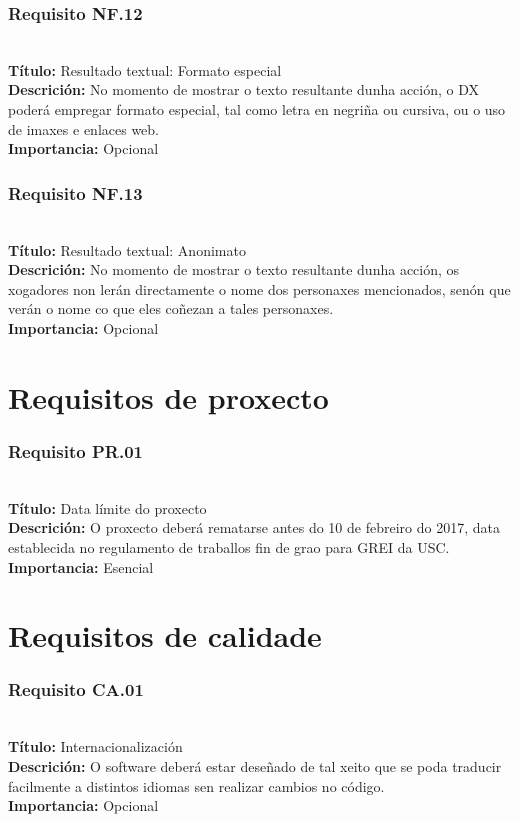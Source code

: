 \subsubsection{Requisito NF.12}~\\
{\bf Título:} Resultado textual: Formato especial\\
{\bf Descrición:} No momento de mostrar o texto resultante dunha acción, o DX
poderá empregar formato especial, tal como letra en negriña ou cursiva, ou o
uso de imaxes e enlaces web.\\
{\bf Importancia:} Opcional

\subsubsection{Requisito NF.13}~\\
{\bf Título:} Resultado textual: Anonimato\\
{\bf Descrición:} No momento de mostrar o texto resultante dunha acción, os
xogadores non lerán directamente o nome dos personaxes mencionados, senón que
verán o nome co que eles coñezan a tales personaxes.\\
{\bf Importancia:} Opcional



\section{Requisitos de proxecto}
\subsubsection{Requisito PR.01}~\\
{\bf Título:} Data límite do proxecto\\
{\bf Descrición:} O proxecto deberá rematarse antes do 10 de febreiro do 2017,
data establecida no regulamento de traballos fin de grao para GREI da USC.\\
{\bf Importancia:} Esencial

\section{Requisitos de calidade}
\subsubsection{Requisito CA.01}~\\
{\bf Título:} Internacionalización\\
{\bf Descrición:} O software deberá estar deseñado de tal xeito que se poda
traducir facilmente a distintos idiomas sen realizar cambios no código.\\
{\bf Importancia:} Opcional

